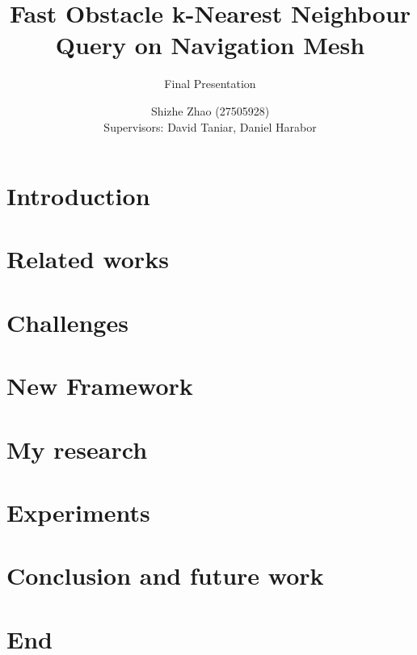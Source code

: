\documentclass{beamer}
\title[Fast Obstacle k-Nearest Neighbour Query on Navigation Mesh]{
    Fast Obstacle k-Nearest Neighbour Query on Navigation Mesh \\
}
\subtitle {Final Presentation}
\date{}
\author[Shizhe Zhao]{
    Shizhe Zhao (27505928)\\
    Supervisors: David Taniar, Daniel Harabor
}
\begin{document}

\frame{\titlepage}
\section[]{}

\section{Introduction}

\section{Related works}

\section{Challenges}

\section{New Framework}

\section{My research}

\section{Experiments}

\section{Conclusion and future work}

\section{End}

\end{document}
